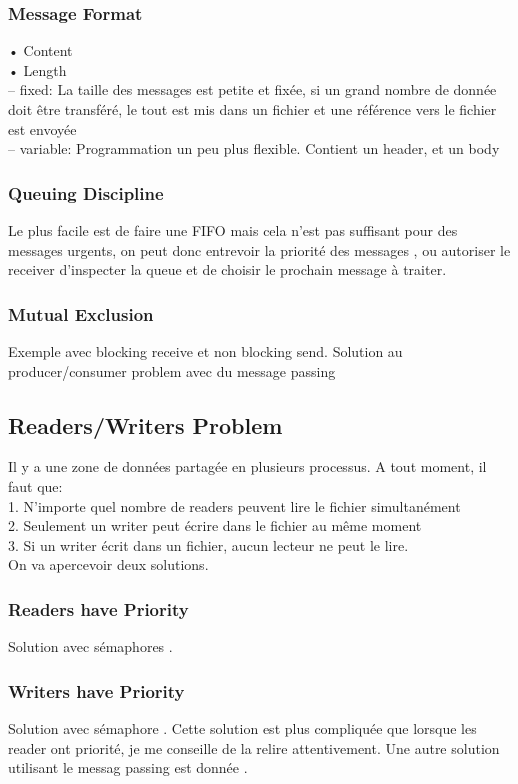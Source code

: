 \subsubsection{Message Format}
\noindent • Content \\
• Length \\
– fixed: La taille des messages est petite et fixée, si un grand nombre de donnée doit être transféré, le tout est mis dans un fichier et une référence vers le fichier est envoyée \\
– variable: Programmation un peu plus flexible. Contient un header, et un body \\
\subsubsection{Queuing Discipline}
Le plus facile est de faire une FIFO mais cela n'est pas suffisant pour des messages urgents, on peut donc entrevoir la priorité des messages , ou autoriser le receiver d'inspecter la queue et de choisir le prochain message à traiter.
\subsubsection{Mutual Exclusion}
Exemple avec blocking receive et non blocking send. \cite[p.~257]{stallings}
Solution au producer/consumer problem avec du message passing \cite[p.~258]{stallings}
\subsection{Readers/Writers Problem}
Il y a une zone de données partagée en plusieurs processus. A tout moment, il faut que: \\
1. N'importe quel nombre de readers peuvent lire le fichier simultanément \\
2. Seulement un writer peut écrire dans le fichier au même moment \\
3. Si un writer écrit dans un fichier, aucun lecteur ne peut le lire. \\
On va apercevoir deux solutions.
\subsubsection{Readers have Priority}
Solution avec sémaphores \cite[p.~260]{stallings}.
\subsubsection{Writers have Priority}
Solution avec sémaphore \cite[p.~261]{stallings}. Cette solution est plus compliquée que lorsque les reader ont priorité, je me conseille de la relire attentivement. Une autre solution utilisant le messag passing est donnée \cite[p.~263]{stallings}.
\newpage

